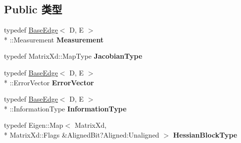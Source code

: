 \subsection*{Public 类型}
\begin{DoxyCompactItemize}
\item 
\hypertarget{classg2o_1_1BaseMultiEdge_acbaff4c018fb314db5c7852054ffb89d}{typedef \hyperlink{classg2o_1_1BaseEdge}{Base\-Edge}$<$ D, E $>$\\*
\-::Measurement {\bfseries Measurement}}\label{classg2o_1_1BaseMultiEdge_acbaff4c018fb314db5c7852054ffb89d}

\item 
\hypertarget{classg2o_1_1BaseMultiEdge_a43dfdf5b27df296a32ee5a11f0653d55}{typedef Matrix\-Xd\-::\-Map\-Type {\bfseries Jacobian\-Type}}\label{classg2o_1_1BaseMultiEdge_a43dfdf5b27df296a32ee5a11f0653d55}

\item 
\hypertarget{classg2o_1_1BaseMultiEdge_ae17c6b5747bfed295214942207a6eb74}{typedef \hyperlink{classg2o_1_1BaseEdge}{Base\-Edge}$<$ D, E $>$\\*
\-::Error\-Vector {\bfseries Error\-Vector}}\label{classg2o_1_1BaseMultiEdge_ae17c6b5747bfed295214942207a6eb74}

\item 
\hypertarget{classg2o_1_1BaseMultiEdge_a368ab136a2cee049549cb479fb4c88fa}{typedef \hyperlink{classg2o_1_1BaseEdge}{Base\-Edge}$<$ D, E $>$\\*
\-::Information\-Type {\bfseries Information\-Type}}\label{classg2o_1_1BaseMultiEdge_a368ab136a2cee049549cb479fb4c88fa}

\item 
\hypertarget{classg2o_1_1BaseMultiEdge_af299cc8f77d917c1ad4a7d8004aec3a1}{typedef Eigen\-::\-Map$<$ Matrix\-Xd, \\*
Matrix\-Xd\-::\-Flags \&Aligned\-Bit?Aligned\-:\-Unaligned $>$ {\bfseries Hessian\-Block\-Type}}\label{classg2o_1_1BaseMultiEdge_af299cc8f77d917c1ad4a7d8004aec3a1}

\end{DoxyCompactItemize}
